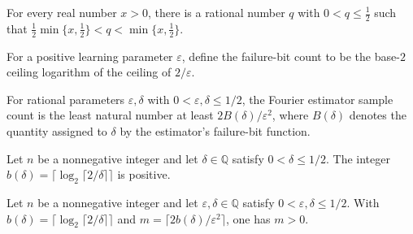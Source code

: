 \begin{theorem}
\label{FABL.exists_positiveLearningParameter_between_half}
\leanok
{}
For every real number $x>0$, there is a rational number $q$ with $0<q\leq \tfrac12$ such
that $\tfrac12\min\{x,\tfrac12\}<q<\min\{x,\tfrac12\}$.
\end{theorem}

\begin{definition}
\label{FABL.fourierEstimatorFailureBits}
\leanok
{}
For a positive learning parameter $\varepsilon$, define the failure-bit count to be the base-$2$
ceiling logarithm of the ceiling of $2/\varepsilon$.
\end{definition}

\begin{definition}
\label{FABL.fourierEstimatorSampleCount}
\leanok
{}
For rational parameters $\varepsilon,\delta$ with $0<\varepsilon,\delta\leq 1/2$, the
Fourier estimator sample count is the least natural number at least
$2B(\delta)/\varepsilon^2$, where $B(\delta)$ denotes the quantity assigned to $\delta$
by the estimator’s failure-bit function.
\end{definition}

\begin{theorem}
\label{FABL.fourierEstimatorFailureBits_pos}
\leanok
{}
Let $n$ be a nonnegative integer and let $\delta\in\mathbb Q$ satisfy $0<\delta\le 1/2$.
The integer $b(\delta)=\lceil\log_2\lceil 2/\delta\rceil\rceil$ is positive.
\end{theorem}

\begin{theorem}
\label{FABL.fourierEstimatorSampleCount_pos}
\leanok
{}
Let $n$ be a nonnegative integer and let $\varepsilon,\delta\in\mathbb Q$ satisfy
$0<\varepsilon,\delta\le 1/2$. With $b(\delta)=\lceil\log_2\lceil 2/\delta\rceil\rceil$
and $m=\lceil 2b(\delta)/\varepsilon^2\rceil$, one has $m>0$.
\end{theorem}

